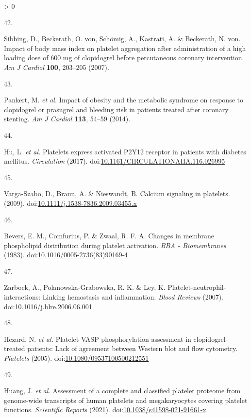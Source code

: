 \documentclass[11pt,twoside]{bristolthesis}
\newlength{\cslhangindent}
\newlength{\csllabelwidth}
\newenvironment{CSLReferences}[2] %
 {%
  \setlength{\parindent}{0pt}
  \ifodd #1 \everypar{\setlength{\hangindent}{\cslhangindent}}\ignorespaces\fi
  \ifnum #2 > 0
  \setlength{\parskip}{#2\baselineskip}
  \fi
 }%
 {}
\newcommand{\CSLLeftMargin}[1]{\parbox[t]{\csllabelwidth}{#1}}
\newcommand{\CSLRightInline}[1]{\parbox[t]{\linewidth - \csllabelwidth}{#1}\break}
\begin{document}
\begin{CSLReferences}{0}{0}
\leavevmode\hypertarget{ref-Sibbing2007}{}%
\CSLLeftMargin{42. }
\CSLRightInline{Sibbing, D., Beckerath, O. von, Schömig, A., Kastrati, A. \& Beckerath, N. von. {Impact of body mass index on platelet aggregation after administration of a high loading dose of 600 mg of clopidogrel before percutaneous coronary intervention}. \emph{Am J Cardiol} \textbf{100}, 203--205 (2007).}

\leavevmode\hypertarget{ref-Pankert2014}{}%
\CSLLeftMargin{43. }
\CSLRightInline{Pankert, M. \emph{et al.} {Impact of obesity and the metabolic syndrome on response to clopidogrel or prasugrel and bleeding risk in patients treated after coronary stenting}. \emph{Am J Cardiol} \textbf{113}, 54--59 (2014).}

\leavevmode\hypertarget{ref-Hu2017}{}%
\CSLLeftMargin{44. }
\CSLRightInline{Hu, L. \emph{et al.} {Platelets express activated P2Y12 receptor in patients with diabetes mellitus}. \emph{Circulation} (2017). doi:\href{https://doi.org/10.1161/CIRCULATIONAHA.116.026995}{10.1161/CIRCULATIONAHA.116.026995}}

\leavevmode\hypertarget{ref-Varga-Szabo2009}{}%
\CSLLeftMargin{45. }
\CSLRightInline{Varga-Szabo, D., Braun, A. \& Nieswandt, B. {Calcium signaling in platelets}. (2009). doi:\href{https://doi.org/10.1111/j.1538-7836.2009.03455.x}{10.1111/j.1538-7836.2009.03455.x}}

\leavevmode\hypertarget{ref-Bevers1983}{}%
\CSLLeftMargin{46. }
\CSLRightInline{Bevers, E. M., Comfurius, P. \& Zwaal, R. F. A. {Changes in membrane phospholipid distribution during platelet activation}. \emph{BBA - Biomembranes} (1983). doi:\href{https://doi.org/10.1016/0005-2736(83)90169-4}{10.1016/0005-2736(83)90169-4}}

\leavevmode\hypertarget{ref-Zarbock2007}{}%
\CSLLeftMargin{47. }
\CSLRightInline{Zarbock, A., Polanowska-Grabowska, R. K. \& Ley, K. {Platelet-neutrophil-interactions: Linking hemostasis and inflammation}. \emph{Blood Reviews} (2007). doi:\href{https://doi.org/10.1016/j.blre.2006.06.001}{10.1016/j.blre.2006.06.001}}

\leavevmode\hypertarget{ref-Hezard2005}{}%
\CSLLeftMargin{48. }
\CSLRightInline{Hezard, N. \emph{et al.} {Platelet VASP phosphorylation assessment in clopidogrel-treated patients: Lack of agreement between Western blot and flow cytometry}. \emph{Platelets} (2005). doi:\href{https://doi.org/10.1080/09537100500212551}{10.1080/09537100500212551}}

\leavevmode\hypertarget{ref-Huang2021}{}%
\CSLLeftMargin{49. }
\CSLRightInline{Huang, J. \emph{et al.} {Assessment of a complete and classified platelet proteome from genome-wide transcripts of human platelets and megakaryocytes covering platelet functions}. \emph{Scientific Reports} (2021). doi:\href{https://doi.org/10.1038/s41598-021-91661-x}{10.1038/s41598-021-91661-x}}


\end{CSLReferences}
\end{document}
